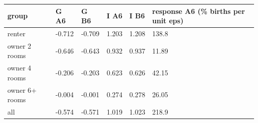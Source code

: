 \begingroup\small
\setlength{\tabcolsep}{3pt}
\renewcommand{\arraystretch}{1.04}
\begin{tabularx}{\linewidth}{XXXXXX}
\toprule
group & G A6 & G B6 & I A6 & I B6 & response A6 (\% births per unit eps) \\
\midrule
renter & -0.712 & -0.709 & 1.203 & 1.208 & 138.8 \\
owner 2 rooms & -0.646 & -0.643 & 0.932 & 0.937 & 11.89 \\
owner 4 rooms & -0.206 & -0.203 & 0.623 & 0.626 & 42.15 \\
owner 6+ rooms & -0.004 & -0.001 & 0.274 & 0.278 & 26.05 \\
all & -0.574 & -0.571 & 1.019 & 1.023 & 218.9 \\
\bottomrule
\end{tabularx}
\endgroup
